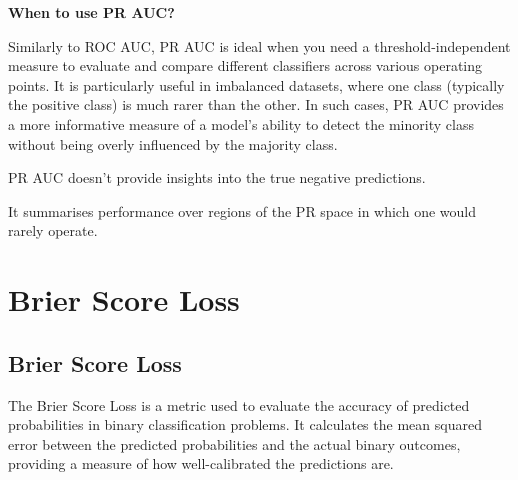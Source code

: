 \textbf{When to use PR AUC?}

Similarly to ROC AUC, PR AUC is ideal when you need a threshold-independent measure to evaluate and compare different classifiers across various operating points. 
It is particularly useful in imbalanced datasets, where one class (typically the positive class) is much rarer than the other. In such cases, PR AUC provides a more
informative measure of a model's ability to detect the minority class without being overly influenced by the majority class.

{
\item PR AUC doesn't provide insights into the true negative predictions.
\item It summarises performance over regions of the PR space in which one would rarely operate.
}


\clearpage
\thispagestyle{classificationstyle}
\section{Brier Score Loss}
\subsection{Brier Score Loss}

The Brier Score Loss is a metric used to evaluate the accuracy of predicted probabilities in binary classification problems.
It calculates the mean squared error between the predicted probabilities and the actual binary outcomes, providing a measure of how well-calibrated the predictions are.

\begin{center}
\end{center}

